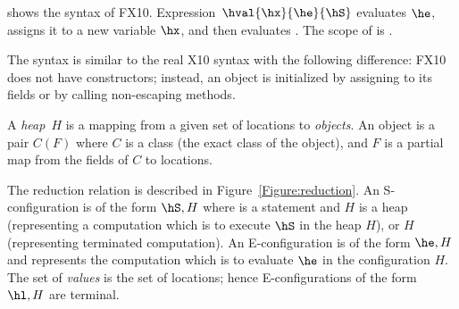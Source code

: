  shows the syntax of FX10.
Expression~$\hval{\hx}{\he}{\hS}$ evaluates $\he$, assigns it to a
new variable $\hx$, and then evaluates \hS. The scope of \hx{} is \hS.

The syntax is similar to the real X10 syntax with the following difference:
FX10 does not have constructors; instead, an object is initialized by assigning to its fields or
    by calling
    non-escaping methods.

A {\em heap}~$H$ is a mapping from a given set of locations to {\em
  objects}. An object is a pair $C(F)$ where $C$ is a class (the exact
class of the object), and $F$ is a partial map from the fields of $C$
to locations.




The reduction relation is described in
Figure~\ref{Figure:reduction}. An S-configuration is of the form
$\hS,H$ where \hS{} is a statement and $H$ is a heap (representing a
computation which is to execute $\hS$ in the heap $H$), or $H$
(representing terminated computation). An
E-configuration is of the form $\he,H$ and represents the
computation which is to evaluate $\he$ in the configuration $H$. The
set of {\em values} is the set of locations; hence E-configurations of
the form $\hl,H$ are terminal.


